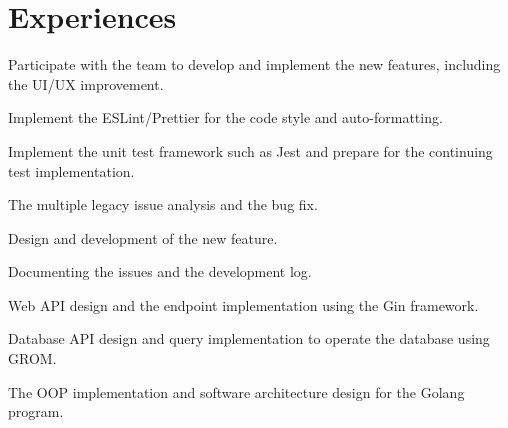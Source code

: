 \section{Experiences}

\begin{resume_list}
\vspace{0.5em}
\item Participate with the team to develop and implement the new features, including the UI/UX improvement.
\item Implement the ESLint/Prettier for the code style and auto-formatting.
\item Implement the unit test framework such as Jest and prepare for the continuing test implementation.
\vspace{0.5em}
\item The multiple legacy issue analysis and the bug fix.
\item  Design and development of the new feature.
\item  Documenting the issues and the development log.
\vspace{0.5em}
\item Web API design and the endpoint implementation using the Gin framework.
\item Database API design and query implementation to operate the database using GROM. 
\item The OOP implementation and software architecture design for the Golang program.
\end{resume_list}


